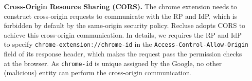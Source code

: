 \noindent\textbf{Cross-Origin Resource Sharing (CORS).} The chrome extension needs to construct cross-origin requests to communicate with the RP and IdP, which is forbidden by default by the same-origin security policy. Recluse adopts CORS to achieve this cross-origin communication. In details, we requires the RP and IdP to specify \verb+chrome-extension://chrome-id+ in the \verb+Access-Control-Allow-Origin+ field of its response header, which makes the request pass the permission checks at the browser. As \verb+chrome-id+ is unique assigned by the Google, no other (malicious) entity can perform the cross-origin communication.





